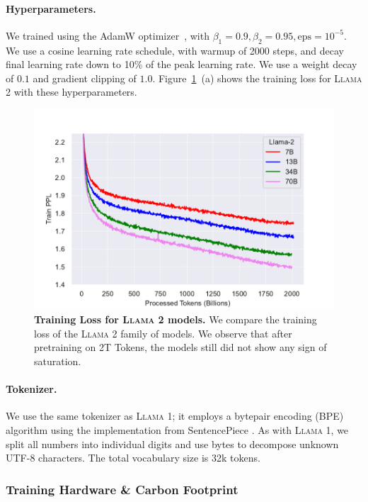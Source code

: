 \documentclass{article}
\newcommand{\anise}{\textsc{Llama 1}\xspace}
\newcommand{\cinnamon}{\textsc{Llama 2}\xspace}
\begin{document}
\paragraph{Hyperparameters.} We trained using the AdamW optimizer~\citep{loshchilov2017decoupled}, with $\beta_1 = 0.9, \beta_2 = 0.95, \text{eps} = 10^{-5}$. We use a cosine learning rate schedule, with warmup of 2000 steps, and decay final learning rate down to 10\% of the peak learning rate. We use a weight decay of $0.1$ and gradient clipping of $1.0$. 
Figure~\ref{fig:train_loss}~(a) shows the training loss for \cinnamon with these hyperparameters.
 
\begin{figure}
    \centering
    \includegraphics[width=0.8 \linewidth]{img/pretraining/loss_train.pdf}
    \caption{\textbf{Training Loss for \cinnamon models.} We compare the training loss of the \cinnamon family of models. We observe that after pretraining on 2T Tokens, the models still did not show any sign of saturation.
    }
    \label{fig:train_loss}
\end{figure}

\paragraph{Tokenizer.} We use the same tokenizer as \anise; it employs a bytepair encoding (BPE) algorithm \citep{sennrich2016neural} using the implementation from SentencePiece \citep{kudo2018sentencepiece}. As with \anise, we split all numbers into individual digits and use bytes to decompose unknown UTF-8 characters. The total vocabulary size is 32k tokens.

\subsubsection{Training Hardware \& Carbon Footprint} 
\end{document}
